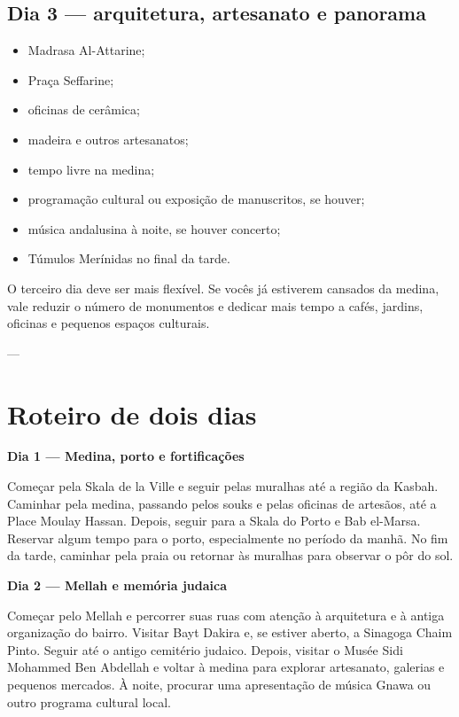 \section*{Dia 3 — arquitetura, artesanato e panorama}

\begin{itemize}
\item Madrasa Al-Attarine;
\item Praça Seffarine;
\item oficinas de cerâmica;
\item madeira e outros artesanatos;
\item tempo livre na medina;
\item programação cultural ou exposição de manuscritos, se houver;
\item música andalusina à noite, se houver concerto;
\item Túmulos Merínidas no final da tarde.
\end{itemize}

O terceiro dia deve ser mais flexível. Se vocês já estiverem cansados da medina, vale reduzir o número de monumentos e dedicar mais tempo a cafés, jardins, oficinas e pequenos espaços culturais.

---

\chapter{Roteiro de dois dias}

\textbf{Dia 1 — Medina, porto e fortificações}

Começar pela Skala de la Ville e seguir pelas muralhas até a região da Kasbah. Caminhar pela medina, passando pelos souks e pelas oficinas de artesãos, até a Place Moulay Hassan. Depois, seguir para a Skala do Porto e Bab el-Marsa. Reservar algum tempo para o porto, especialmente no período da manhã. No fim da tarde, caminhar pela praia ou retornar às muralhas para observar o pôr do sol.

\textbf{Dia 2 — Mellah e memória judaica}

Começar pelo Mellah e percorrer suas ruas com atenção à arquitetura e à antiga organização do bairro. Visitar Bayt Dakira e, se estiver aberto, a Sinagoga Chaim Pinto. Seguir até o antigo cemitério judaico. Depois, visitar o Musée Sidi Mohammed Ben Abdellah e voltar à medina para explorar artesanato, galerias e pequenos mercados. À noite, procurar uma apresentação de música Gnawa ou outro programa cultural local.

